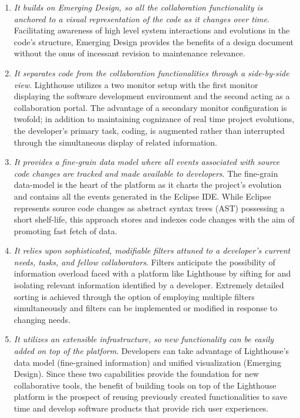 \documentclass[10pt, conference, compsocconf]{IEEEtran}
\begin{document}
\begin{enumerate}
\item \textit{It builds on Emerging Design, so all the collaboration functionality is anchored to a visual representation of the code as it changes over time}.  Facilitating awareness of high level system interactions and evolutions in the code's
structure, Emerging Design provides the benefits of a design document without the onus of incessant revision to maintenance relevance. 

\item \textit{It separates code from the collaboration functionalities through a side-by-side view}. Lighthouse utilizes a two monitor setup with the first monitor displaying the software development environment and the second acting as a
collaboration portal. The advantage of a secondary monitor configuration is twofold; in addition to maintaining cognizance of real time project evolutions, the developer's primary task, coding, is augmented rather than interrupted through the simultaneous display of related information.
  
\item \textit{It provides a fine-grain data model where all events associated with source code changes are tracked and made available to developers}. The fine-grain data-model is the heart of the platform as it charts the project's evolution and
contains all the events generated in the Eclipse IDE.  While Eclipse represents source code changes as abstract syntax trees (AST) possessing a short shelf-life, this approach stores and indexes code changes with the aim of
promoting fast fetch of data.

\item\textit{ It relies upon sophisticated, modifiable filters attuned to a developer's current needs, tasks, and fellow collaborators}.  Filters anticipate the possibility of information overload faced with a platform like Lighthouse by sifting for and isolating relevant information identified by a developer.  Extremely detailed sorting is achieved through the option of employing multiple filters simultaneously and filters can be implemented or modified in response to changing needs. 
 
\item \textit{It utilizes an extensible infrastructure, so new  functionality can be easily added on top of the platform}. Developers can take advantage of Lighthouse's data model (fine-grained information) and unified visualization (Emerging Design). Since these two capabilities provide the foundation for new collaborative tools, the benefit of building tools on top of the Lighthouse platform is the prospect of reusing previously created functionalities to save time and develop software products that provide rich user experiences.
\end{enumerate}
\end{document}
